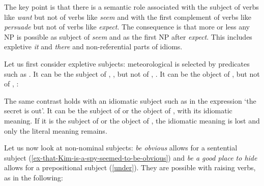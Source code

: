 The key point is that there is a semantic role associated with the subject of verbs like
\emph{want} but not of verbs like \emph{seem} and with the first complement of verbs like
\emph{persuade} but not of verbs like \emph{expect}.  The consequence is that more or less any NP
is possible as subject of \emph{seem} and as the first NP after \emph{expect}. This includes
expletive \emph{it} and \emph{there} and non-referential parts of idioms.

Let us first consider expletive subjects: meteorological  is selected by predicates
such as . It can be the subject of , , but not of ,
. It can be the object of ,  but not of ,
:
	
\eal
{}
 \label{rain1}
 \label{rain2}
\zl
\eal
{} \label{rain3}
 \label{rain4}
\zl
 	
The same contrast holds with an idiomatic subject such as  in the expression  `the secret is out'. It can be the subject of  or the object of
, with its idiomatic meaning. If it is the subject of  or the object of
, the idiomatic meaning is lost and only the literal meaning remains. 
 
\eal
\judgewidth{\#}
 \label{cat1}
 \label{cat2}
 \label{cat3}
 \label{cat4}
\zl

Let us now look at non-nominal subjects: \emph{be obvious} allows for a sentential subject (\ref{ex-that-Kim-is-a-spy-seemed-to-be-obvious}) and
\emph{be a good place to hide} allows for a prepositional subject (\ref{under}). They are possible with raising
verbs, as in the following: 
 
\eal
{} 
 \label{ex-that-Kim-is-a-spy-seemed-to-be-obvious}
\zl
\eal
{}
 \label{under}
\zl



